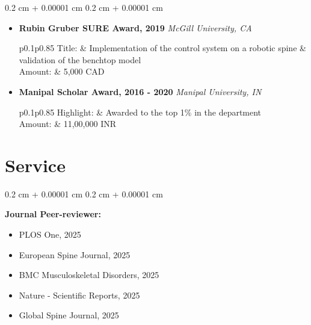 \documentclass[10pt, letterpaper]{article}
\newenvironment{highlights}{
    \begin{itemize}[
        topsep=0.10 cm,
        parsep=0.10 cm,
        partopsep=0pt,
        itemsep=0pt,
        leftmargin=0.4 cm + 10pt
    ]
}{
    \end{itemize}
} %
\newenvironment{onecolentry}{
    \begin{adjustwidth}{
        0.2 cm + 0.00001 cm
    }{
        0.2 cm + 0.00001 cm
    }
}{
    \end{adjustwidth}
} %
\begin{document}
\begin{onecolentry}
\begin{highlights}
                \item \textbf{Rubin Gruber SURE Award, 2019} \hfill \textit{McGill University, CA}  \\[0.1cm]
                \begin{tabular}{{p{0.1\linewidth}p{0.85\linewidth}}}
                Title:  &  Implementation of the control system on a robotic spine \& validation of the benchtop model \\
                Amount: &  5,000 CAD
                \end{tabular}

                
                \item \textbf{Manipal Scholar Award, 2016 - 2020} \hfill \textit{Manipal University, IN}  \\[0.1cm]
                \begin{tabular}{{p{0.1\linewidth}p{0.85\linewidth}}}
                Highlight:  &  Awarded to the top 1\% in the department\\
                Amount: &  11,00,000 INR
                \end{tabular}
                
                 
                
            \end{highlights}
        \end{onecolentry}
    




    







\section{Service}
   \begin{onecolentry}
        \textbf{Journal Peer-reviewer:}
        
            \begin{itemize}
                \item PLOS One, 2025
                \item European Spine Journal, 2025
                \item BMC Musculoskeletal Disorders, 2025
                \item Nature - Scientific Reports, 2025
                \item Global Spine Journal, 2025
            \end{itemize}
         
        \end{onecolentry}
       \vspace{0.2 cm}
\end{document}
